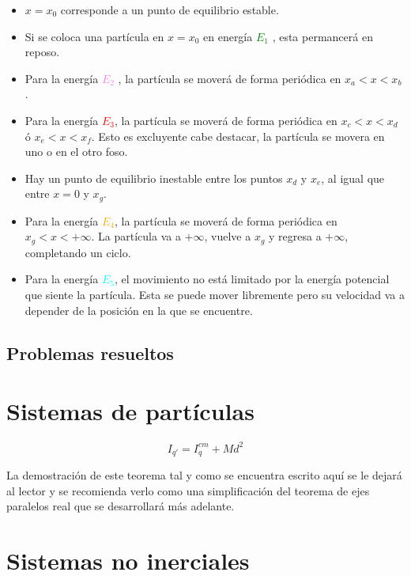 \documentclass[/home/hernan/Documentos/Apuntes_mecanica_teorica/main.tex]{subfiles}
\begin{document}
	\begin{itemize}
		\item $x = x_{0}$ corresponde a un punto de equilibrio estable.
		\item Si se coloca una partícula en $x = x_{0}$ en energía \textcolor{green}{$E_{1}$} , esta permancerá en reposo.
		\item Para la energía \textcolor{violet}{$E_{2}$} , la partícula se moverá de forma periódica en $x_{a} < x < x_{b}$.
		\item Para la energía \textcolor{red}{$E_{3}$}, la partícula se moverá de forma periódica en $x_{c} < x < x_{d}$ ó $x_{e} < x < x_{f}$. Esto es excluyente cabe destacar, la partícula se movera en uno o en el otro foso.
		\item Hay un punto de equilibrio inestable entre los puntos $x_{d}$ y $x_{e}$, al igual que entre $x = 0$ y $x_{g}$.
		\item Para la energía \textcolor{orange}{$E_{4}$}, la partícula se moverá de forma periódica en $x_{g} < x < +\infty $. La partícula va a $+\infty$, vuelve a $x_{g}$ y regresa a $+\infty$, completando un ciclo.
		\item Para la energía \textcolor{cyan}{$E_{5}$}, el movimiento no está limitado por la energía potencial que siente la partícula. Esta se puede mover libremente pero su velocidad va a depender de la posición en la que se encuentre.
	\end{itemize}


	\subsection{Problemas resueltos}

	
	

	\section{Sistemas de partículas}
	\label{sec: sisparticulas}



	\begin{theorem}
		\begin{equation}
			I_{{q}'}= I_{q}^{cm} + Md^{2}
		\end{equation}

		La demostración de este teorema tal y como se encuentra escrito aquí se le dejará al lector y se recomienda verlo como una simplificación del teorema de ejes paralelos real que se desarrollará más adelante.
	\end{theorem}
	
	\section{Sistemas no inerciales}
	\label{sec: noinerciales}
\end{document}
